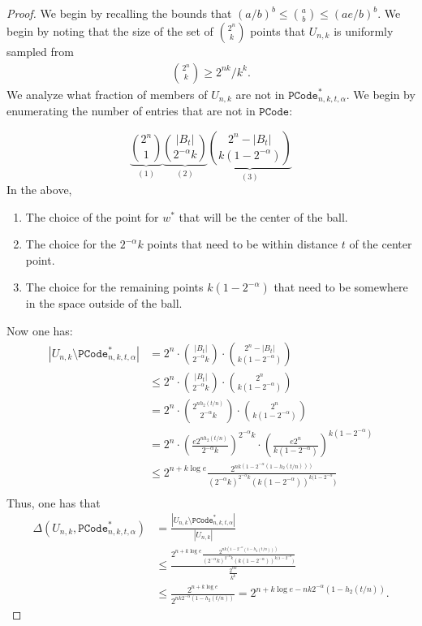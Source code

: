  \begin{proof} We begin by recalling the bounds that $(a/b)^b \le {a\choose b} \le (ae/b)^b$.
 We begin by noting that the size of the set of ${2^n \choose k}$ points that $U_{n,k}$ is uniformly sampled from
 \begin{align*}
 {2^n\choose k} \ge 2^{nk}/k^k.
 \end{align*}  We analyze what fraction of members of $U_{n,k}$ are not in $\mathtt{PCode}_{n, k, t, \alpha}^{*}$.
 We begin by enumerating the number of entries that are not in $\mathtt{PCode}$:
 
 \[
  \underbrace{{2^n \choose 1}}_{(1)}  \underbrace{{|B_t| \choose 2^{-\alpha}k}}_{(2)}   \underbrace{{2^n-|B_t| \choose k(1-2^{-\alpha})}}_{(3)}
 \]
 In the above, 
 \begin{enumerate}
 \itemsep0em
 \item The choice of the point for $w^*$ that will be the center of the ball.
 \item The choice for the $2^{-\alpha} k$ points that need to be within distance $t$ of the center point.
 \item The choice for the remaining points $k(1-2^{-\alpha})$ that need to be somewhere in the space outside of the ball.
 \end{enumerate}
 Now one has: 
 \begin{align*}
|U_{n, k} \setminus \mathtt{PCode}_{n, k, t, \alpha}^{*}|  &=2^n \cdot {|B_t| \choose 2^{-\alpha}k}\cdot {2^n-|B_t| \choose k(1-2^{-\alpha})}\\
&\le 2^n \cdot {|B_t| \choose 2^{-\alpha}k}\cdot {2^n \choose k(1-2^{-\alpha})}\\
&= 2^n \cdot {2^{nh_2(t/n)} \choose 2^{-\alpha}k}\cdot {2^n \choose k(1-2^{-\alpha})}\\
&= 2^n \cdot \left(\frac{e2^{nh_2(t/n)}}{2^{-\alpha}k}\right)^{2^{-\alpha}k}\cdot \left(\frac{e2^n}{k(1-2^{-\alpha})}\right)^{k(1-2^{-\alpha})}\\
&\le 2^{n+k\log e} \frac{2^{nk(1-2^{-\alpha}(1-h_2(t/n)))}}{(2^{-\alpha}k)^{2^{-\alpha}k} (k(1-2^{-\alpha}))^{k(1-2^{-\alpha}})}\\
 \end{align*}
 Thus, one has that 
 \begin{align*}
\Delta(U_{n,k}, \mathtt{PCode}_{n, k, t, \alpha}^{*}) &= \frac{|U_{n, k} \setminus \mathtt{PCode}_{n, k, t, \alpha}^{*}|}{|U_{n, k}|}\\
&\le\frac{2^{n+k\log e} \frac{2^{nk(1-2^{-\alpha}(1-h_2(t/n)))}}{(2^{-\alpha}k)^{2^{-\alpha}k} (k(1-2^{-\alpha}))^{k(1-2^{-\alpha}})}}{\frac{2^{nk}}{k^k}}\\
&\le \frac{2^{n+k\log e}}{2^{nk2^{-\alpha}(1-h_2(t/n))}} = 2^{n+k\log e- nk2^{-\alpha}(1-h_2(t/n))}.
 \end{align*}
  \end{proof}